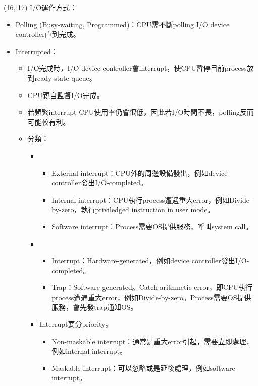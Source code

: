\item \begin{theorem}{(16, 17)} I/O運作方式：\begin{itemize}
        \item Polling (Busy-waiting, Programmed)：CPU需不斷polling I/O device controller直到完成。
        \item Interrupted：\begin{itemize}
            \item I/O完成時，I/O device controller會interrupt，使CPU暫停目前process放到ready state queue。
            \item CPU親自監督I/O完成。
            \item 若頻繁interrupt CPU使用率仍會很低，因此若I/O時間不長，polling反而可能較有利。
            \item 分類：\begin{itemize}
                \item \begin{itemize}
                    \item External interrupt：CPU外的周邊設備發出，例如device controller發出I/O-completed。
                    \item Internal interrupt：CPU執行process遭遇重大error，例如Divide-by-zero，執行priviledged instruction in user mode。
                    \item Software interrupt：Process需要OS提供服務，呼叫system call。
                \end{itemize}
                \item \begin{itemize}
                    \item Interrupt：Hardware-generated，例如device controller發出I/O-completed。
                    \item Trap：Software-generated。Catch arithmetic error，即CPU執行process遭遇重大error，例如Divide-by-zero。Process需要OS提供服務，會先發trap通知OS。
                \end{itemize}
                \item Interrupt要分priority。\begin{itemize}
                    \item Non-maskable interrupt：通常是重大error引起，需要立即處理，例如internal interrupt。
                    \item Maskable interrupt：可以忽略或是延後處理，例如software interrupt。
                \end{itemize}
            \end{itemize}

\end{itemize}
\end{itemize}
\end{theorem}
